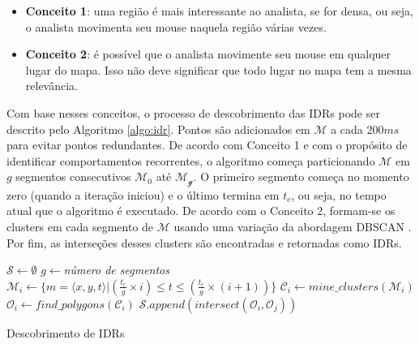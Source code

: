 \begin{itemize}
	\item \textbf{Conceito 1}: uma região é mais interessante ao analista, se for densa, ou seja, o analista movimenta seu mouse naquela região várias vezes.
	\item \textbf{Conceito 2}: é possível que o analista movimente seu mouse em qualquer lugar do mapa. Isso não deve significar que todo lugar no mapa tem a mesma relevância.
\end{itemize}

Com base nesses conceitos, o processo de descobrimento das IDRs pode ser descrito pelo Algoritmo \ref{algo:idr}. Pontos são adicionados em $\mathcal{M}$ a cada $200ms$ para evitar pontos redundantes. De acordo com Conceito 1 e com o propósito de identificar comportamentos recorrentes, o algoritmo começa particionando $\mathcal{M}$ em $g$ segmentos consecutivos $\mathcal{M_0}$ até $\mathcal{M_g}$. O primeiro segmento começa no momento zero (quando a iteração iniciou) e o último termina em $t_c$, ou seja, no tempo atual que o algoritmo é executado. De acordo com o Conceito 2, formam-se os clusters em cada segmento de $\mathcal{M}$ usando uma variação da abordagem DBSCAN \cite{Ester:1996}. Por fim, as interseções desses clusters são encontradas e retornadas como IDRs.

\begin{algorithm}[t]
	\DontPrintSemicolon
	$\mathcal{S} \gets \emptyset$\;
	$g \gets ${\em número de segmentos}\;
	{
		   $\mathcal{M}_i \gets \{m = \langle x,y,t \rangle | (\frac{t_c}{g} \times i) \leq t \leq (\frac{t_c}{g} \times (i+1))\}$\;
		   $\mathcal{C}_i \gets \mathit{mine\_clusters}(\mathcal{M}_i)$\label{ln:mine}\;
		   $\mathcal{O}_i \gets \mathit{find\_polygons}(\mathcal{C}_i)$\label{ln:poly}\;
	}
	{
		   $\mathcal{S}.\mathit{append}(\mathit{intersect}(\mathcal{O}_i, \mathcal{O}_j))$
	}
	\; 
	\caption{Descobrimento de IDRs}
	\label{algo:idr}
\end{algorithm}

